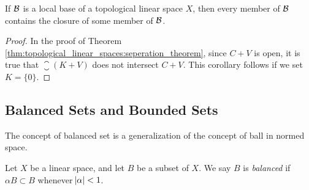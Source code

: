 \begin{cor}
If $\mathcal{B}$ is a local base of a topological linear space $X$, then every 
member of $\mathcal{B}$ contains the closure of some member of $\mathcal{B}$. 
\end{cor}
\begin{proof}
In the proof of Theorem \ref{thm:topological_linear_spaces:seperation_theorem}, 
since $C + V$ is open, it is true that $\closure{(K + V)}$ does not intersect 
$C + V$. 
This corollary follows if we set $K = \{ 0 \}$. 
\end{proof}

\subsection{Balanced Sets and Bounded Sets}
The concept of balanced set is a generalization of the concept of ball in 
normed space. 
\begin{defn}
Let $X$ be a linear space, and let $B$ be a subset of $X$. 
We say $B$ is \emph{balanced} if $\alpha B \subset B$ whenever $\abs{\alpha}
 < 1$. 
\end{defn}

